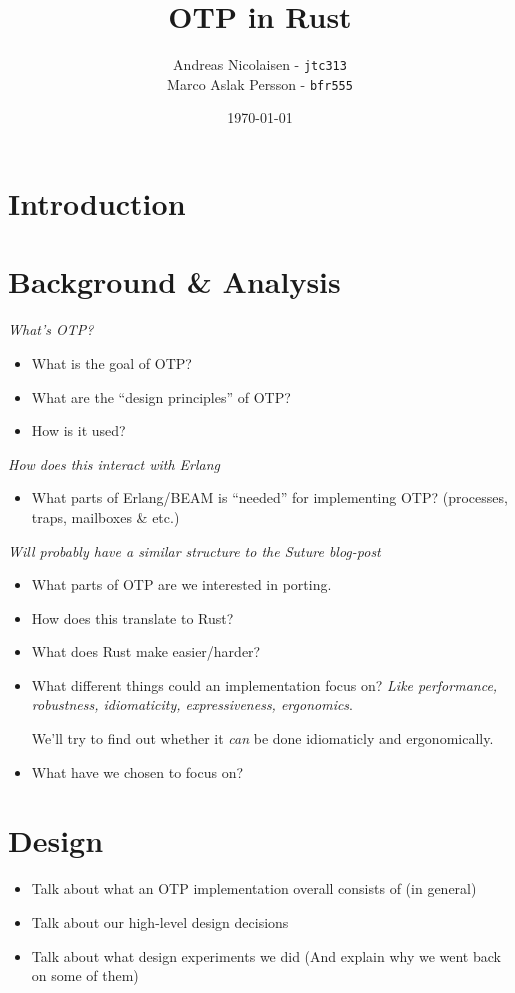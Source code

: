 \documentclass[a4paper]{article}
\title{OTP in Rust}
\author{Andreas Nicolaisen - \texttt{jtc313} \\ Marco Aslak Persson - \texttt{bfr555}}
\date{\today}
\begin{document}
\maketitle

\section{Introduction}

\section{Background \& Analysis}
\textit{What's OTP?}
\begin{itemize}
\item What is the goal of OTP?
\item What are the ``design principles'' of OTP?
\item How is it used?
\end{itemize}

\textit{How does this interact with Erlang}
\begin{itemize}
\item What parts of Erlang/BEAM is ``needed'' for implementing OTP? (processes,
  traps, mailboxes \& etc.)
\end{itemize}

\textit{Will probably have a similar structure to the Suture blog-post}
\begin{itemize}
\item What parts of OTP are we interested in porting.
\item How does this translate to Rust?
\item What does Rust make easier/harder?
\item What different things could an implementation focus on?
  \textit{Like performance, robustness, idiomaticity, expressiveness, ergonomics}.

  We'll try to find out whether it \textit{can} be done idiomaticly and ergonomically.

\item What have we chosen to focus on?
\end{itemize}

\section{Design}
\begin{itemize}
\item Talk about what an OTP implementation overall consists of (in general)
\item Talk about our high-level design decisions
\item Talk about what design experiments we did (And explain why we went back on
  some of them)
\end{itemize}
\end{document}
